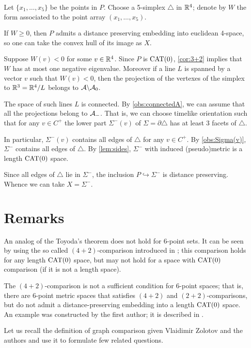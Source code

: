 \documentclass{article}
\begin{document}
Let $\{x_1,\dots,x_5\}$ be the points in $P$.
Choose a 5-simplex $\triangle$ in $\mathbb{R}^4$; denote by $W$ the form associated to the point array $(x_1,\dots,x_5)$.

If $W\ge0$, then $P$ admits a distance preserving embedding into euclidean 4-space, so one can take the convex hull of its image as $X$.

Suppose $W(v)<0$ for some $v\in\mathbb{R}^4$.
Since $P$ is $\mathrm{CAT}(0)$, \ref{cor:3+2} implies that $W$ has at most one negative eigenvalue.
Moreover if a line $L$ is spanned by a vector $v$ such that $W(v)<0$, then the projection of the vertexes of the simplex to $\mathbb{R}^3=\mathbb{R}^4/L$ belongs to $\mathcal{A}\backslash\mathcal{A}_0$.

The space of such lines $L$ is connected.
By \ref{obs:connectedA}, we can assume that all the projections belong to $\mathcal{A}_-$.
That is, we can choose timelike orientation such that for any $v\in C^+$ the lower part $\Sigma^-(v)$ of $\Sigma=\partial \triangle$ has at least 3 facets of $\triangle$.

In particular, $\Sigma^-(v)$ contains all edges of $\triangle$ for any $v\in C^+$.
By \ref{obs:Sigma(v)}, $\Sigma^-$ contains all edges of $\triangle$.
By \ref{lem:sides}, $\Sigma^-$ with induced (pseudo)metric is a length $\mathrm{CAT}(0)$ space.

Since all edges of $\triangle$ lie in $\Sigma^-$, the inclusion $P\hookrightarrow \Sigma^-$ is distance preserving.
Whence we can take $X=\Sigma^-$.
\qeds

\section{Remarks}

An analog of the Toyoda's theorem does not hold for 6-point sets.
It can be seen by using the so called $(4{+}2)$-comparison introduced in \cite{alexander-kapovitch-petrunin-2011};
this comparison holds for any length $\mathrm{CAT}(0)$ space, but may not hold for a space with $\mathrm{CAT}(0)$ comparison (if it is not a length space).

The $(4{+}2)$-comparison is not a sufficient condition for $6$-point spaces;
that is, there are 6-point metric spaces that satisfies $(4{+}2)$ and $(2{+}2)$-comparisons, but do not admit a distance-preserving embedding into a length $\mathrm{CAT}(0)$ space.
An example was constructed by the first author; it is described in \cite{alexander-kapovitch-petrunin-2011}.

Let us recall the definition of graph comparison given Vlaidimir Zolotov and the authors \cite{lebedeva-petrunin-zolotov} and use it to formulate few related questions.
\end{document}
